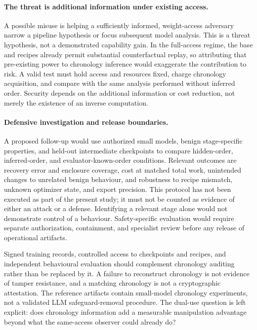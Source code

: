 \paragraph{The threat is additional information under existing access.}
A possible misuse is helping a sufficiently informed, weight-access adversary narrow a pipeline hypothesis or focus subsequent model analysis. This is a threat hypothesis, not a demonstrated capability gain. In the full-access regime, the base and recipes already permit substantial counterfactual replay, so attributing that pre-existing power to chronology inference would exaggerate the contribution to risk. A valid test must hold access and resources fixed, charge chronology acquisition, and compare with the same analysis performed without inferred order. Security depends on the additional information or cost reduction, not merely the existence of an inverse computation.

\paragraph{Defensive investigation and release boundaries.}
A proposed follow-up would use authorized small models, benign stage-specific properties, and held-out intermediate checkpoints to compare hidden-order, inferred-order, and evaluator-known-order conditions. Relevant outcomes are recovery error and enclosure coverage, cost at matched total work, unintended changes to unrelated benign behaviour, and robustness to recipe mismatch, unknown optimizer state, and export precision. This protocol has not been executed as part of the present study; it must not be counted as evidence of either an attack or a defense. Identifying a relevant stage alone would not demonstrate control of a behaviour. Safety-specific evaluation would require separate authorization, containment, and specialist review before any release of operational artifacts.

Signed training records, controlled access to checkpoints and recipes, and independent behavioural evaluation should complement chronology auditing rather than be replaced by it. A failure to reconstruct chronology is not evidence of tamper resistance, and a matching chronology is not a cryptographic attestation. The reference artifacts contain small-model chronology experiments, not a validated LLM safeguard-removal procedure. The dual-use question is left explicit: does chronology information add a measurable manipulation advantage beyond what the same-access observer could already do?

